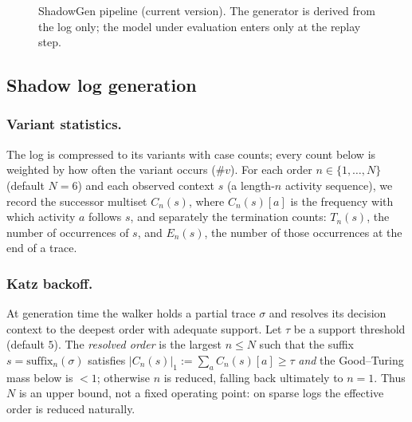 \documentclass[runningheads]{llncs}
\newcommand{\genshadow}{\ensuremath{\mathit{Gen}_{\mathit{shadow}}}}
\newcommand{\genaccept}{\ensuremath{\mathit{Gen}_{\mathit{accept}}}}
\newcommand{\punseen}{\ensuremath{p_{\mathit{unseen}}}}
\newcommand{\pend}{\ensuremath{p_{\mathit{end}}}}
\begin{document}
\begin{figure}[t]
\centering
{}
\caption{ShadowGen pipeline (current version). The generator is derived from the log only; the model under evaluation enters only at the replay step.}
\label{fig:pipeline}
\end{figure}

\subsection{Shadow log generation}
\label{sec:method:gen}

\subsubsection{Variant statistics.}
The log is compressed to its variants with case counts; every count below is weighted by how often the variant occurs ($\#v$). For each order $n\in\{1,\dots,N\}$ (default $N{=}6$) and each observed context $s$ (a length-$n$ activity sequence), we record the successor multiset $C_n(s)$, where $C_n(s)[a]$ is the frequency with which activity $a$ follows $s$, and separately the termination counts: $T_n(s)$, the number of occurrences of $s$, and $E_n(s)$, the number of those occurrences at the end of a trace.

\subsubsection{Katz backoff.}
At generation time the walker holds a partial trace $\sigma$ and resolves its decision context to the deepest order with adequate support. Let $\tau$ be a support threshold (default $5$). The \emph{resolved order} is the largest $n\le N$ such that the suffix $s=\mathrm{suffix}_n(\sigma)$ satisfies $|C_n(s)|_1 := \sum_a C_n(s)[a] \ge \tau$ \emph{and} the Good--Turing mass below is $<1$; otherwise $n$ is reduced, falling back ultimately to $n{=}1$. Thus $N$ is an upper bound, not a fixed operating point: on sparse logs the effective order is reduced naturally.
\end{document}
